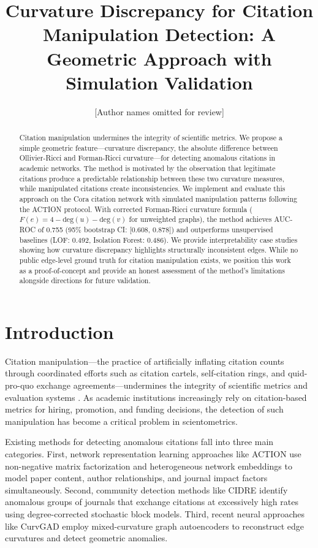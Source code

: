 \documentclass[11pt,letterpaper]{article}
\title{Curvature Discrepancy for Citation Manipulation Detection: A Geometric Approach with Simulation Validation}
\author{[Author names omitted for review]}
\date{}
\begin{document}
\maketitle

\begin{abstract}
Citation manipulation undermines the integrity of scientific metrics. We propose a simple geometric feature---curvature discrepancy, the absolute difference between Ollivier-Ricci and Forman-Ricci curvature---for detecting anomalous citations in academic networks. The method is motivated by the observation that legitimate citations produce a predictable relationship between these two curvature measures, while manipulated citations create inconsistencies. We implement and evaluate this approach on the Cora citation network with simulated manipulation patterns following the ACTION protocol. With corrected Forman-Ricci curvature formula ($F(e) = 4 - \text{deg}(u) - \text{deg}(v)$ for unweighted graphs), the method achieves AUC-ROC of 0.755 (95\% bootstrap CI: [0.608, 0.878]) and outperforms unsupervised baselines (LOF: 0.492, Isolation Forest: 0.486). We provide interpretability case studies showing how curvature discrepancy highlights structurally inconsistent edges. While no public edge-level ground truth for citation manipulation exists, we position this work as a proof-of-concept and provide an honest assessment of the method's limitations alongside directions for future validation.
\end{abstract}

\section{Introduction}

Citation manipulation---the practice of artificially inflating citation counts through coordinated efforts such as citation cartels, self-citation rings, and quid-pro-quo exchange agreements---undermines the integrity of scientific metrics and evaluation systems \cite{Liu2024}. As academic institutions increasingly rely on citation-based metrics for hiring, promotion, and funding decisions, the detection of such manipulation has become a critical problem in scientometrics.

Existing methods for detecting anomalous citations fall into three main categories. First, network representation learning approaches like ACTION \cite{Liu2024} use non-negative matrix factorization and heterogeneous network embeddings to model paper content, author relationships, and journal impact factors simultaneously. Second, community detection methods like CIDRE \cite{Kojaku2021} identify anomalous groups of journals that exchange citations at excessively high rates using degree-corrected stochastic block models. Third, recent neural approaches like CurvGAD \cite{Grover2025} employ mixed-curvature graph autoencoders to reconstruct edge curvatures and detect geometric anomalies.
\end{document}
